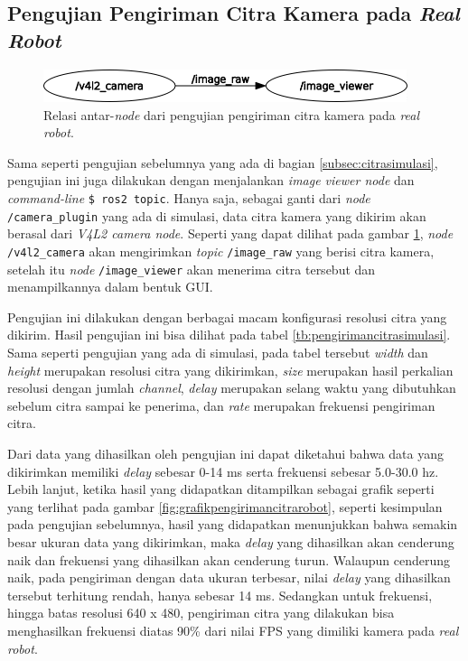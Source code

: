 \subsection{Pengujian Pengiriman Citra Kamera pada \emph{Real Robot}}
\label{subsec:citrarobot}

\begin{figure}[ht]
  \centering
  \includegraphics[width=0.95\textwidth,keepaspectratio]{gambar/rosgraph-camera.png}
  \caption{Relasi antar-\emph{node} dari pengujian pengiriman citra kamera pada \emph{real robot}.}
  \label{fig:rosgraphcamera}
\end{figure}

Sama seperti pengujian sebelumnya yang ada di bagian \ref{subsec:citrasimulasi},
  pengujian ini juga dilakukan dengan menjalankan \emph{image viewer node} dan \emph{command-line} \lstinline{$ ros2 topic}.
Hanya saja, sebagai ganti dari \emph{node} \lstinline{/camera_plugin} yang ada di simulasi,
  data citra kamera yang dikirim akan berasal dari \emph{V4L2 camera node}.
Seperti yang dapat dilihat pada gambar \ref{fig:rosgraphcamera},
  \emph{node} \lstinline{/v4l2_camera} akan mengirimkan \emph{topic} \lstinline{/image_raw} yang berisi citra kamera,
  setelah itu \emph{node} \lstinline{/image_viewer} akan menerima citra tersebut dan menampilkannya dalam bentuk GUI.



Pengujian ini dilakukan dengan berbagai macam konfigurasi resolusi citra yang dikirim.
Hasil pengujian ini bisa dilihat pada tabel \ref{tb:pengirimancitrasimulasi}.
Sama seperti pengujian yang ada di simulasi, pada tabel tersebut \emph{width} dan \emph{height} merupakan resolusi citra yang dikirimkan,
  \emph{size} merupakan hasil perkalian resolusi dengan jumlah \emph{channel},
  \emph{delay} merupakan selang waktu yang dibutuhkan sebelum citra sampai ke penerima,
  dan \emph{rate} merupakan frekuensi pengiriman citra.

Dari data yang dihasilkan oleh pengujian ini dapat diketahui bahwa data yang dikirimkan memiliki \emph{delay} sebesar 0-14 ms serta frekuensi sebesar 5.0-30.0 hz.
Lebih lanjut, ketika hasil yang didapatkan ditampilkan sebagai grafik seperti yang terlihat pada gambar \ref{fig:grafikpengirimancitrarobot},
  seperti kesimpulan pada pengujian sebelumnya,
  hasil yang didapatkan menunjukkan bahwa semakin besar ukuran data yang dikirimkan,
  maka \emph{delay} yang dihasilkan akan cenderung naik dan frekuensi yang dihasilkan akan cenderung turun.
Walaupun cenderung naik, pada pengiriman dengan data ukuran terbesar,
  nilai \emph{delay} yang dihasilkan tersebut terhitung rendah, hanya sebesar 14 ms.
Sedangkan untuk frekuensi,
  hingga batas resolusi 640 x 480,
  pengiriman citra yang dilakukan bisa menghasilkan frekuensi diatas 90\% dari nilai FPS yang dimiliki kamera pada \emph{real robot}.


